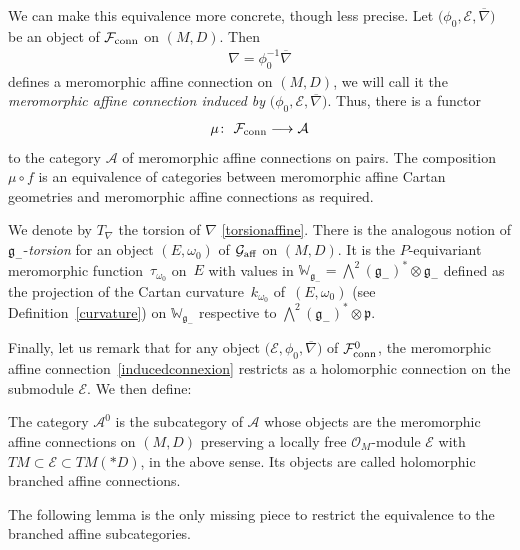 \documentclass[10pt,a4paper]{amsart}
\numberwithin{equation}{section}
\begin{document}
We can make this equivalence more concrete, though less precise. Let $\big(\phi_0,\mathcal{E},\overline{\nabla}\big)$ be an object of $\mathcal{F}_{\rm conn}$ on $(M,D)$. Then \begin{gather}\label{inducedconnexion} \nabla = \phi_0^{-1} \overline{\nabla} \end{gather}
defines a meromorphic affine connection on $(M,D)$, we will call it the \textit{meromorphic affine connection induced by} $\big(\phi_0,\mathcal{E},\overline{\nabla}\big)$. Thus, there is a functor \begin{gather}\label{fonctmu} \mu\colon\ \mathcal{F}_{\rm conn} \longrightarrow \mathcal{A} \end{gather} to the category $\mathcal{A}$ of meromorphic affine connections on pairs. The composition $\mu\circ f$ is an equivalence of categories between meromorphic affine Cartan geometries and meromorphic affine connections as required.

We denote by $T_\nabla$ the torsion of $\nabla$ \eqref{torsionaffine}. There is the analogous notion of $\mathfrak{g}_-$-\textit{torsion} for an object $(E,\omega_0)$ of $\mathcal{G}_{\rm aff}$ on $(M,D)$. It is the $P$-equivariant meromorphic function~$\tau_{\omega_0}$ on~$E$ with values in $\mathbb{W}_{\mathfrak{g}_-} = \bigwedge^{2} (\mathfrak{g}_-)^* \otimes \mathfrak{g}_-$ defined as the projection of the Cartan curvature~$k_{\omega_0}$ of~$(E,\omega_0)$ (see Definition~\ref{curvature}) on $\mathbb{W}_{\mathfrak{g}_-}$ respective to $\bigwedge^{2} (\mathfrak{g}_-)^* \otimes \mathfrak{p}$.

 Finally, let us remark that for any object $\big(\mathcal{E},\phi_0,\overline{\nabla}\big)$ of $\mathcal{F}_{\rm conn}^0$, the meromorphic affine connection~\eqref{inducedconnexion} restricts as a holomorphic connection on the submodule $\mathcal{E}$. We then define: \begin{Definition}\label{branchedaffine} The category $\mathcal{A}^0$ is the subcategory of $\mathcal{A}$ whose objects are the meromorphic affine connections on $(M,D)$ preserving a locally free $\mathcal{O}_M$-module $\mathcal{E}$ with $TM\subset \mathcal{E}\subset TM(* D)$, in the above sense. Its objects 	are called holomorphic branched affine connections. \end{Definition}

 The following lemma is the only missing piece to restrict the equivalence to the branched affine subcategories.
\end{document}
